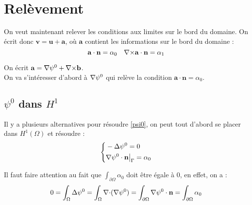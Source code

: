 \section{Relèvement}
\label{relev}
On veut maintenant relever les conditions aux limites sur le bord du domaine. On écrit donc $\mathbf{v}=\mathbf{u}+\mathbf{a}$, où $\mathbf{a}$ contient les informations sur le bord du domaine :
\[ \mathbf{a}\cdot\mathbf{n}=\alpha_0\quad {\nabla\times}\mathbf{a}\cdot\mathbf{n}=\alpha_1 \]

On écrit $\mathbf{a}={\nabla}\psi^0 + {\nabla\times}\mathbf{b}$.\\
On va s'intéresser d'abord à ${\nabla}\psi^0$ qui relève la condition $\mathbf{a}\cdot\mathbf{n}=\alpha_0$.\\

\subsection{$\psi^0$ dans $H^1$}
\label{secpsi0hdiv}
Il y a plusieurs alternatives pour résoudre \ref{psi0}, on peut tout d'abord se placer dans $H^1(\Omega)$ et résoudre :
\begin{equation*}
\left\{\begin{aligned}
&-{\Delta}\psi^0 = 0\\
&{\nabla}\psi^0\cdot \mathbf{n}{\big\rvert_{\Gamma}}=\alpha_0
\end{aligned}\right.
\end{equation*}

Il faut faire attention au fait que $\int_{\partial\Omega} \alpha_0$ doit être égale à 0, en effet, on a :
\[ 0=\int_\Omega {\Delta} \psi^0 = \int_\Omega {\nabla\cdot}({\nabla}\psi^0) = \int_{\partial\Omega} {\nabla}\psi^0\cdot \mathbf{n} = \int_{\partial\Omega} \alpha_0 \]

